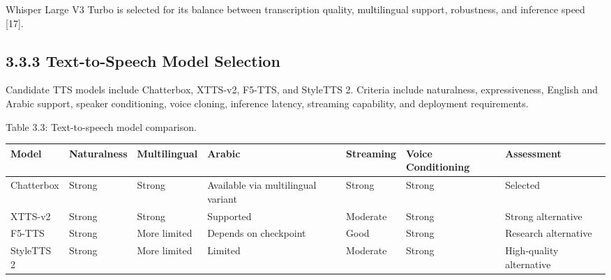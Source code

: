 \documentclass[
  letterpaper,
  12pt,
  a4paper,
  openany]{report}
\newcounter{none} %
\begin{document}
Whisper Large V3 Turbo is selected for its balance between transcription
quality, multilingual support, robustness, and inference speed {[}17{]}.

\subsection{3.3.3 Text-to-Speech Model
Selection}\label{text-to-speech-model-selection}

Candidate TTS models include Chatterbox, XTTS-v2, F5-TTS, and StyleTTS
2. Criteria include naturalness, expressiveness, English and Arabic
support, speaker conditioning, voice cloning, inference latency,
streaming capability, and deployment requirements.

Table 3.3: Text-to-speech model comparison.

{\def\LTcaptype{none} %
\begin{longtable}[]{@{}
  >{\raggedright\arraybackslash}p{}
  >{\raggedright\arraybackslash}p{}
  >{\raggedright\arraybackslash}p{}
  >{\raggedright\arraybackslash}p{}
  >{\raggedright\arraybackslash}p{}
  >{\raggedright\arraybackslash}p{}
  >{\raggedright\arraybackslash}p{}@{}}
\toprule\noalign{}
\begin{minipage}[b]{\linewidth}\raggedright
Model
\end{minipage} & \begin{minipage}[b]{\linewidth}\raggedright
Naturalness
\end{minipage} & \begin{minipage}[b]{\linewidth}\raggedright
Multilingual
\end{minipage} & \begin{minipage}[b]{\linewidth}\raggedright
Arabic
\end{minipage} & \begin{minipage}[b]{\linewidth}\raggedright
Streaming
\end{minipage} & \begin{minipage}[b]{\linewidth}\raggedright
Voice Conditioning
\end{minipage} & \begin{minipage}[b]{\linewidth}\raggedright
Assessment
\end{minipage} \\
\midrule\noalign{}
\endhead
\bottomrule\noalign{}
\endlastfoot
Chatterbox & Strong & Strong & Available via multilingual variant &
Strong & Strong & Selected \\
XTTS-v2 & Strong & Strong & Supported & Moderate & Strong & Strong
alternative \\
F5-TTS & Strong & More limited & Depends on checkpoint & Good & Strong &
Research alternative \\
StyleTTS 2 & Strong & More limited & Limited & Moderate & Strong &
High-quality alternative \\
\end{longtable}
}
\end{document}
